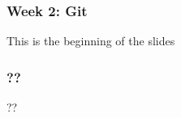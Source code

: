 \documentclass[11pt]{beamer}
\begin{document}
\begin{frame}
\frametitle{Week 2: Git}
This is the beginning of the slides
\end{frame}

\begin{frame}
\frametitle{??}
??
\end{frame}
\end{document}
